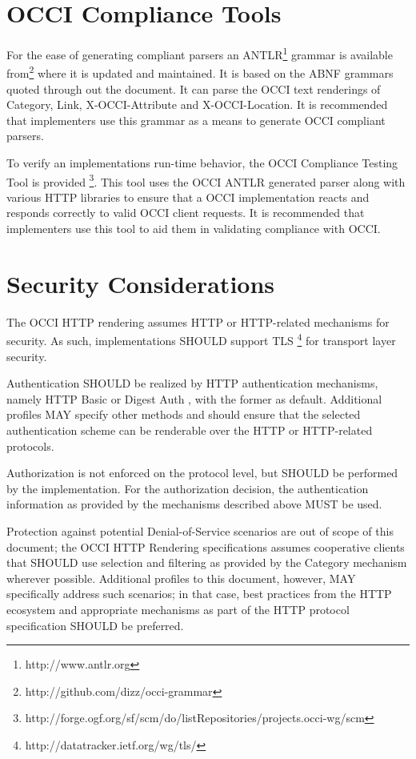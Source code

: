 \documentclass[10pt,a4paper]{article}
\begin{document}
\section{OCCI Compliance Tools}
For the ease of generating compliant parsers an
ANTLR\footnote{http://www.antlr.org} grammar is available
from\footnote{http://github.com/dizz/occi-grammar} where it is updated
and maintained. It is based on the ABNF grammars quoted through out
the document. It can parse the OCCI text renderings of Category, Link,
X-OCCI-Attribute and X-OCCI-Location. It is recommended that
implementers use this grammar as a means to generate OCCI compliant
parsers.

To verify an implementations run-time behavior, the OCCI Compliance
Testing Tool is provided
\footnote{http://forge.ogf.org/sf/scm/do/listRepositories/projects.occi-wg/scm}.
This tool uses the OCCI ANTLR generated parser along with various HTTP
libraries to ensure that a OCCI implementation reacts and responds
correctly to valid OCCI client requests. It is recommended that
implementers use this tool to aid them in validating compliance with
OCCI.

\section{Security Considerations}
\label{sec:sec_consid}
The OCCI HTTP rendering assumes HTTP or HTTP-related mechanisms for
security. As such, implementations SHOULD support
TLS \footnote{http://datatracker.ietf.org/wg/tls/} for transport layer
security.

Authentication SHOULD be realized by HTTP authentication mechanisms,
namely HTTP Basic or Digest Auth \cite{rfc2617}, with the former as
default. Additional profiles MAY specify other methods and should
ensure that the selected authentication scheme can be renderable over
the HTTP or HTTP-related protocols.

Authorization is not enforced on the protocol level, but SHOULD be
performed by the implementation. For the authorization decision, the
authentication information as provided by the mechanisms described
above MUST be used.

Protection against potential Denial-of-Service scenarios are out of
scope of this document; the OCCI HTTP Rendering specifications assumes
cooperative clients that SHOULD use selection and filtering as
provided by the Category mechanism wherever possible. Additional
profiles to this document, however, MAY specifically address such
scenarios; in that case, best practices from the HTTP ecosystem and
appropriate mechanisms as part of the HTTP protocol specification
SHOULD be preferred.
\end{document}
